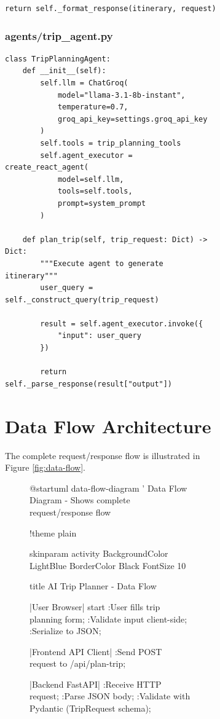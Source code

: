 \documentclass[12pt,a4paper]{report}
\begin{document}
\begin{figure}[H]
\begin{plantuml}
\begin{figure}[H]
\begin{plantuml}
\begin{lstlisting}[style=pythonstyle, caption={Trip Service Orchestration}]
        return self._format_response(itinerary, request)
\end{lstlisting}

\subsubsection{agents/trip\_agent.py}

\begin{lstlisting}[style=pythonstyle, caption={LangChain Agent Implementation}]
class TripPlanningAgent:
    def __init__(self):
        self.llm = ChatGroq(
            model="llama-3.1-8b-instant",
            temperature=0.7,
            groq_api_key=settings.groq_api_key
        )
        self.tools = trip_planning_tools
        self.agent_executor = create_react_agent(
            model=self.llm,
            tools=self.tools,
            prompt=system_prompt
        )
    
    def plan_trip(self, trip_request: Dict) -> Dict:
        """Execute agent to generate itinerary"""
        user_query = self._construct_query(trip_request)
        
        result = self.agent_executor.invoke({
            "input": user_query
        })
        
        return self._parse_response(result["output"])
\end{lstlisting}

\section{Data Flow Architecture}

The complete request/response flow is illustrated in Figure \ref{fig:data-flow}.

\begin{figure}[H]
    \centering
    \begin{plantuml}
@startuml data-flow-diagram
' Data Flow Diagram - Shows complete request/response flow

!theme plain

skinparam activity {
    BackgroundColor LightBlue
    BorderColor Black
    FontSize 10
}

title AI Trip Planner - Data Flow

|User Browser|
start
:User fills trip planning form;
:Validate input client-side;
:Serialize to JSON;

|Frontend API Client|
:Send POST request to /api/plan-trip;

|Backend FastAPI|
:Receive HTTP request;
:Parse JSON body;
:Validate with Pydantic (TripRequest schema);


\end{plantuml}
\end{figure}
\end{plantuml}
\end{figure}
\end{plantuml}
\end{figure}
\end{document}
